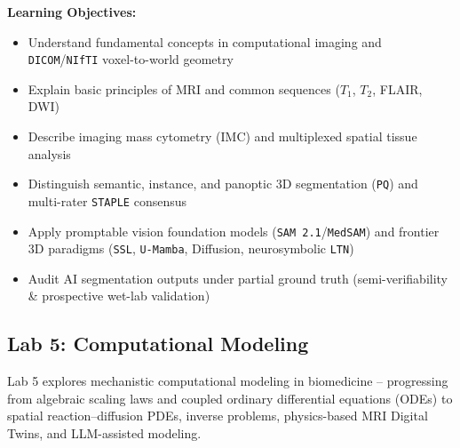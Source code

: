 \documentclass[11pt,a4paper]{article}
\begin{document}
\textbf{Learning Objectives:}
\begin{itemize}[nosep]
    \item Understand fundamental concepts in computational imaging and \texttt{DICOM}/\texttt{NIfTI} voxel-to-world geometry
    \item Explain basic principles of MRI and common sequences ($T_1$, $T_2$, FLAIR, DWI)
    \item Describe imaging mass cytometry (IMC) and multiplexed spatial tissue analysis
    \item Distinguish semantic, instance, and panoptic 3D segmentation (\texttt{PQ}) and multi-rater \texttt{STAPLE} consensus
    \item Apply promptable vision foundation models (\texttt{SAM\,2.1}/\texttt{MedSAM}) and frontier 3D paradigms (\texttt{SSL}, \texttt{U-Mamba}, Diffusion, neurosymbolic \texttt{LTN})
    \item Audit AI segmentation outputs under partial ground truth (semi-verifiability \& prospective wet-lab validation)
\end{itemize}

\subsection{Lab 5: Computational Modeling}

Lab 5 explores mechanistic computational modeling in biomedicine -- progressing from algebraic scaling laws and coupled ordinary differential equations (ODEs) to spatial reaction--diffusion PDEs, inverse problems, physics-based MRI Digital Twins, and LLM-assisted modeling.
\end{document}
